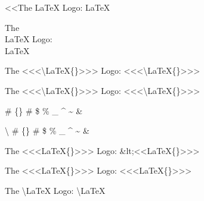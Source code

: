 
<<The \LaTeX{} Logo: {\mktsStyleCode{}\LaTeX{}}\mktsShowpar\par
The \\LaTeX{} Logo: {\mktsStyleCode{}\\LaTeX{}}\mktsShowpar\par
The <<<\textbackslash{}LaTeX\{\}>>> Logo: {\mktsStyleCode{}<<<\textbackslash{}LaTeX\{\}>>>}\mktsShowpar\par
The <<<\textbackslash{}LaTeX\{\}>>> Logo: {\mktsStyleCode{}<<<\textbackslash{}LaTeX\{\}>>>}\mktsShowpar\par
 \#  \{\} \# \$ \% \_ \textasciicircum{} \textasciitilde{} \&\mktsShowpar\par
{\mktsStyleCode{}\textbackslash{} \#  \{\} \# \$ \% \_ \textasciicircum{} \textasciitilde{} \&}\mktsShowpar\par
The <<<LaTeX\{\}>>> Logo: {\mktsStyleCode{}\&lt;<<LaTeX\{\}>>>}\mktsShowpar\par
The <<<LaTeX\{\}>>> Logo: {\mktsStyleCode{}<<<LaTeX\{\}>>>}\mktsShowpar\par
The \textbackslash{}\LaTeX{} Logo: {\mktsStyleCode{}\textbackslash{}\LaTeX{}}\mktsShowpar\par

